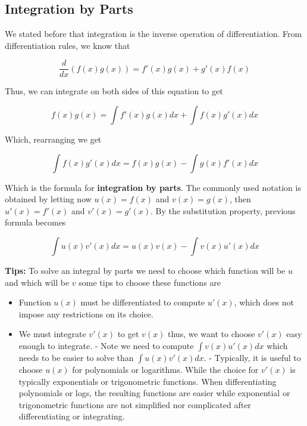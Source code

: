 \documentclass[a4paper,11pt]{article}
\theoremstyle{definition}
\theoremstyle{plain}
\begin{document}
\subsection{Integration by Parts}\label{integration-by-parts}

We stated before that integration is the inverse operation of differentiation. From differentiation rules, we know that

\[
\frac{d}{dx}\left(f(x)g(x)\right) = f'(x)g(x) + g'(x)f(x)
\]

Thus, we can integrate on both sides of this equation to get

\[
f(x)g(x) = \int f'(x)g(x) dx + \int f(x)g'(x) dx
\]

Which, rearranging we get

\begin{equation}
\int f(x) g'(x) dx = f(x)g(x) - \int g(x)f'(x) dx
\end{equation}

Which is the formula for \textbf{integration by parts}. The commonly used notation is obtained by letting now \(u(x) = f(x)\) and \(v(x) = g(x)\), then \(u'(x) = f'(x)\) and \(v'(x) = g'(x)\). By the substitution property, previous formula becomes

\[
\int u(x)v'(x) dx = u(x)v(x) - \int v(x)u'(x)dx
\]

\textbf{Tips:} To solve an integral by parts we need to choose which function will be \(u\) and which will be \(v\) some tips to choose these functions are 

\begin{itemize}
	\item Function \(u(x)\) must be differentiated to compute \(u'(x)\), which does not impose any restrictions on its choice. 

	\item We must integrate \(v'(x)\) to get \(v(x)\) thus, we want to choose \(v'(x)\) easy enough to integrate. - Note we need to compute \(\int v(x)u'(x)dx\) which needs to be easier to solve than \(\int u(x)v'(x)dx\). - Typically, it is useful to choose \(u(x)\) for polynomials or logarithms. While the choice for \(v'(x)\) is typically exponentials or trigonometric functions. When differentiating polynomials or logs, the resulting functions are easier while exponential or trigonometric functions are not simplified nor complicated after differentiating or integrating.
\end{itemize}
\end{document}

